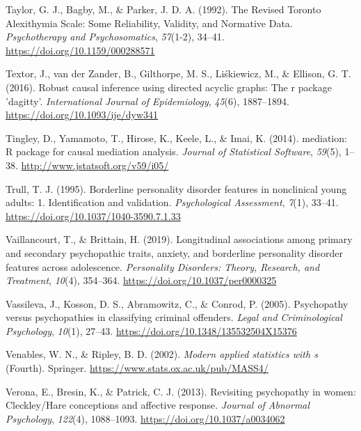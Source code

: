 \documentclass[
  man,floatsintext]{apa7}
\newlength{\cslhangindent}
\newlength{\cslentryspacingunit} %
\newenvironment{CSLReferences}[2] %
 {%
  \setlength{\parindent}{0pt}
  \ifodd #1
  \let\oldpar\par
  \def\par{\hangindent=\cslhangindent\oldpar}
  \fi
  \setlength{\parskip}{#2\cslentryspacingunit}
 }%
 {}
\begin{document}
\begin{CSLReferences}{1}{0}
\leavevmode{}%
Taylor, G. J., Bagby, M., \& Parker, J. D. A. (1992). The {Revised Toronto Alexithymia Scale}: {Some Reliability}, {Validity}, and {Normative Data}. \emph{Psychotherapy and Psychosomatics}, \emph{57}(1-2), 34--41. \url{https://doi.org/10.1159/000288571}

\leavevmode{}%
Textor, J., van der Zander, B., Gilthorpe, M. S., Liśkiewicz, M., \& Ellison, G. T. (2016). Robust causal inference using directed acyclic graphs: The r package 'dagitty'. \emph{International Journal of Epidemiology}, \emph{45}(6), 1887--1894. \url{https://doi.org/10.1093/ije/dyw341}

\leavevmode{}%
Tingley, D., Yamamoto, T., Hirose, K., Keele, L., \& Imai, K. (2014). {mediation}: {R} package for causal mediation analysis. \emph{Journal of Statistical Software}, \emph{59}(5), 1--38. \url{http://www.jstatsoft.org/v59/i05/}

\leavevmode{}%
Trull, T. J. (1995). Borderline personality disorder features in nonclinical young adults: 1. {Identification} and validation. \emph{Psychological Assessment}, \emph{7}(1), 33--41. \url{https://doi.org/10.1037/1040-3590.7.1.33}

\leavevmode{}%
Vaillancourt, T., \& Brittain, H. (2019). Longitudinal associations among primary and secondary psychopathic traits, anxiety, and borderline personality disorder features across adolescence. \emph{Personality Disorders: Theory, Research, and Treatment}, \emph{10}(4), 354--364. \url{https://doi.org/10.1037/per0000325}

\leavevmode{}%
Vassileva, J., Kosson, D. S., Abramowitz, C., \& Conrod, P. (2005). Psychopathy versus psychopathies in classifying criminal offenders. \emph{Legal and Criminological Psychology}, \emph{10}(1), 27--43. \url{https://doi.org/10.1348/135532504X15376}

\leavevmode{}%
Venables, W. N., \& Ripley, B. D. (2002). \emph{Modern applied statistics with s} (Fourth). Springer. \url{https://www.stats.ox.ac.uk/pub/MASS4/}

\leavevmode{}%
Verona, E., Bresin, K., \& Patrick, C. J. (2013). Revisiting psychopathy in women: {Cleckley}/{Hare} conceptions and affective response. \emph{Journal of Abnormal Psychology}, \emph{122}(4), 1088--1093. \url{https://doi.org/10.1037/a0034062}


\end{CSLReferences}
\end{document}
